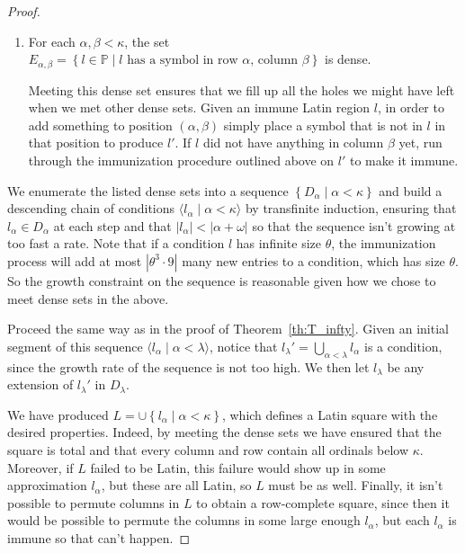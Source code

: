 \documentclass[12pt,a4paper]{article}
\newcommand{\st}{\; | \;}
\newcommand{\set}[2]{\left\{#1\st #2 \right\}}
\newcommand{\seq}[2]{\langle #1 \st #2 \rangle}
\renewcommand{\P}{\mathbb{P}}
\begin{document}
\begin{proof}
\begin{enumerate}
		\item For each $\alpha, \beta < \kappa$, the set $E_{\alpha, \beta}=\set{l \in \P}{\text{$l$ has a symbol in row $\alpha$, column $\beta$}}$ is dense.
		
		Meeting this dense set ensures that we fill up all the holes we might have left when we met other dense sets. Given an immune Latin region $l$, in order to add something to position $(\alpha, \beta)$ simply place a symbol that is not in $l$ in that position to produce $l'$. If $l$ did not have anything in column $\beta$ yet, run through the immunization procedure outlined above on $l'$ to make it immune.
\end{enumerate}

We enumerate the listed dense sets into a sequence $\set{D_\alpha}{\alpha<\kappa}$ and build a descending chain of conditions $\seq{l_\alpha}{\alpha<\kappa}$ by transfinite induction, ensuring that $l_\alpha\in D_\alpha$ at each step and that $|l_\alpha|<|\alpha+\omega|$ so that the sequence isn't growing at too fast a rate. Note that if a condition $l$ has infinite size $\theta$, the immunization process will add at most $|\theta^3 \cdot 9|$ many new entries to a condition, which has size $\theta$. So the growth constraint on the sequence is reasonable given how we chose to meet dense sets in the above.

Proceed the same way as in the proof of Theorem~\ref{th:T_infty}. Given an initial segment of this sequence $\seq{l_\alpha}{\alpha<\lambda}$, notice that $l_\lambda'=\bigcup_{\alpha<\lambda}l_\alpha$ is a condition, since the growth rate of the sequence is not too high. We then let $l_\lambda$ be any extension of $l_\lambda'$ in $D_\lambda$.

We have produced $L=\cup \set{l_\alpha}{\alpha<\kappa}$, which defines a Latin square with the desired properties. Indeed, by meeting the dense sets we have ensured that the square is total and that every column and row contain all ordinals below $\kappa$. Moreover, if $L$ failed to be Latin, this failure would show up in some approximation $l_\alpha$, but these are all Latin, so $L$ must be as well. Finally, it isn't possible to permute columns in $L$ to obtain a row-complete square, since then it would be possible to permute the columns in some large enough $l_\alpha$, but each $l_\alpha$ is immune so that can't happen. 
\end{proof}
\end{document}
